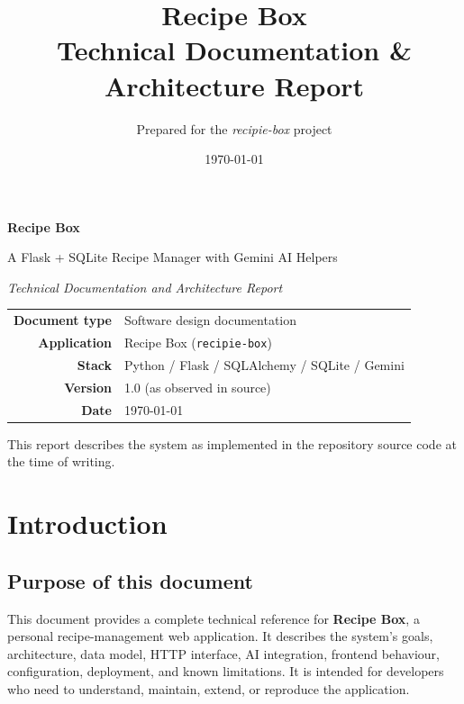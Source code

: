\documentclass[11pt,a4paper]{article}
\title{\vspace{-1.5cm}\textbf{\color{accent}Recipe Box}\\[0.3em]
       \large Technical Documentation \& Architecture Report}
\author{Prepared for the \emph{recipie-box} project}
\date{\today}
\newcommand{\code}[1]{\texttt{#1}}
\begin{document}

\begin{titlepage}
  \centering
  \vspace*{3cm}
  {\Huge\bfseries\color{accent} Recipe Box\par}
  \vspace{0.6cm}
  {\Large A Flask + SQLite Recipe Manager with Gemini AI Helpers\par}
  \vspace{1.2cm}
  {\large\itshape Technical Documentation and Architecture Report\par}
  \vfill
  \begin{tabular}{rl}
    \toprule
    \textbf{Document type}   & Software design documentation \\
    \textbf{Application}     & Recipe Box (\code{recipie-box}) \\
    \textbf{Stack}           & Python / Flask / SQLAlchemy / SQLite / Gemini \\
    \textbf{Version}         & 1.0 (as observed in source) \\
    \textbf{Date}            & \today \\
    \bottomrule
  \end{tabular}
  \vfill
  {\small This report describes the system as implemented in the repository
   source code at the time of writing.}
  \vspace*{1.5cm}
\end{titlepage}

\tableofcontents
\newpage

\section{Introduction}

\subsection{Purpose of this document}
This document provides a complete technical reference for \textbf{Recipe Box},
a personal recipe-management web application. It describes the system's goals,
architecture, data model, HTTP interface, AI integration, frontend behaviour,
configuration, deployment, and known limitations. It is intended for developers
who need to understand, maintain, extend, or reproduce the application.
\end{document}
